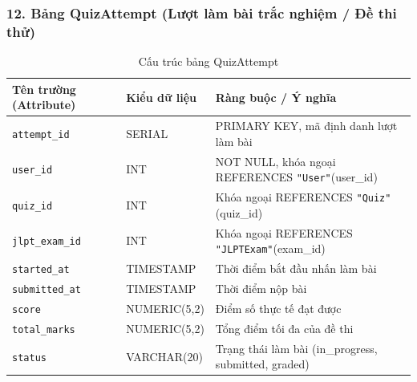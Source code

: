 \documentclass[../DoAn.tex]{subfiles}
\begin{document}
\subsubsection*{12. Bảng QuizAttempt (Lượt làm bài trắc nghiệm / Đề thi thử)}
\begin{table}[H]
\centering
\footnotesize
\renewcommand{\arraystretch}{1.2}
\begin{tabular}{|p{4.2cm}|p{3.2cm}|p{7.1cm}|}
\hline
\textbf{Tên trường (Attribute)} & \textbf{Kiểu dữ liệu} & \textbf{Ràng buộc / Ý nghĩa} \\
\hline
\texttt{attempt\_id} & SERIAL & PRIMARY KEY, mã định danh lượt làm bài \\
\hline
\texttt{user\_id} & INT & NOT NULL, khóa ngoại REFERENCES \texttt{"User"}(user\_id) \\
\hline
\texttt{quiz\_id} & INT & Khóa ngoại REFERENCES \texttt{"Quiz"}(quiz\_id) \\
\hline
\texttt{jlpt\_exam\_id} & INT & Khóa ngoại REFERENCES \texttt{"JLPTExam"}(exam\_id) \\
\hline
\texttt{started\_at} & TIMESTAMP & Thời điểm bắt đầu nhấn làm bài \\
\hline
\texttt{submitted\_at} & TIMESTAMP & Thời điểm nộp bài \\
\hline
\texttt{score} & NUMERIC(5,2) & Điểm số thực tế đạt được \\
\hline
\texttt{total\_marks} & NUMERIC(5,2) & Tổng điểm tối đa của đề thi \\
\hline
\texttt{status} & VARCHAR(20) & Trạng thái làm bài (in\_progress, submitted, graded) \\
\hline
\end{tabular}
\caption{Cấu trúc bảng QuizAttempt}
\label{tab:schema_quizattempt}
\end{table}
\end{document}
